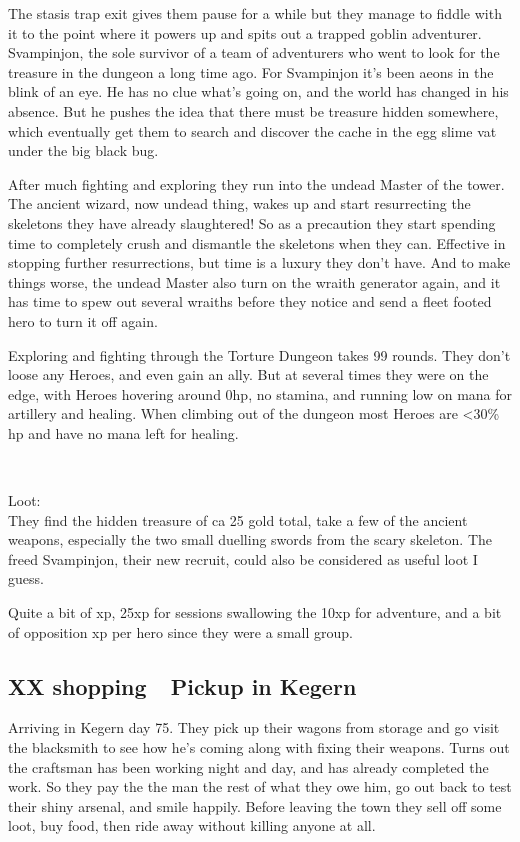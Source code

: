 The stasis trap exit gives them pause for a while but they manage to fiddle with it to the point where it powers up and spits out a trapped goblin adventurer. Svampinjon, the sole survivor of a team of adventurers who went to look for the treasure in the dungeon a long time ago. For Svampinjon it's been aeons in the blink of an eye. He has no clue what's going on, and the world has changed in his absence. But he pushes the idea that there must be treasure hidden somewhere, which eventually get them to search and discover the cache in the egg slime vat under the big black bug.

After much fighting and exploring they run into the undead Master of the tower. The ancient wizard, now undead thing, wakes up and start resurrecting the skeletons they have already slaughtered! So as a precaution they start spending time to completely crush and dismantle the skeletons when they can. Effective in stopping further resurrections, but time is a luxury they don't have.
And to make things worse, the undead Master also turn on the wraith generator again, and it has time to spew out several wraiths before they notice and send a fleet footed hero to turn it off again.

Exploring and fighting through the Torture Dungeon takes 99 rounds. They don't loose any Heroes, and even gain an ally. But at several times they were on the edge, with Heroes hovering around 0hp, no stamina, and running low on mana for artillery and healing. When climbing out of the dungeon most Heroes are <30\% hp and have no mana left for healing.

\

Loot:\\
They find the hidden treasure of ca 25 gold total, take a few of the ancient weapons, especially the two small duelling swords from the scary skeleton.
The freed Svampinjon, their new recruit, could also be considered as useful loot I guess.

Quite a bit of xp, 25xp for sessions swallowing the 10xp for adventure, and a bit of opposition xp per hero since they were a small group.


\subsection*{XX shopping~\mdash~Pickup in Kegern}

Arriving in Kegern day 75. They pick up their wagons from storage and go visit the blacksmith to see how he's coming along with fixing their weapons. Turns out the craftsman has been working night and day, and has already completed the work. So they pay the the man the rest of what they owe him, go out back to test their shiny arsenal, and smile happily. Before leaving the town they sell off some loot, buy food, then ride away without killing anyone at all.


